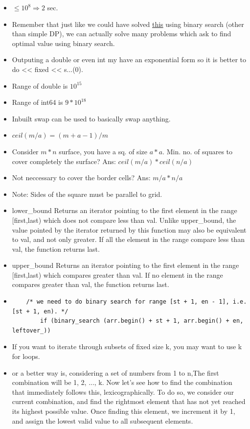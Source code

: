 \documentclass[8pt, a4paper, oneside, twocolumn]{extarticle}
\begin{document}
\begin{itemize}
\begin{verbatim}
    }
}
\end{verbatim}
    \item $\leq 10^8 \Rightarrow 2$ sec.
    \item Remember that just like we could have solved \href{https://uva.onlinejudge.org/external/7/714.pdf}{this} using binary search (other than simple DP), we can actually solve many problems which ask to find optimal value using binary search.
    \item Outputing a double or even int my have an exponential form so it is better to do << fixed << s...(0).
    \item Range of double is $10^{15}$
    \item Range of int64 is $9 * 10^{18}$
    \item Inbuilt swap can be used to basically swap anything.
    \item $ceil(m/a) = (m + a - 1) / m$
    \item Consider $m*n$ surface, you have a sq. of size $a*a$. Min. no. of squares to cover completely the surface? Ans: $ceil(m/a)*ceil(n/a)$
    \item Not neccessary to cover the border cells? Ans: $m/a * n/a$
    \item Note: Sides of the square must be parallel to grid.
    \item  lower\_bound Returns an iterator pointing to the first element in the range [first,last) which does not compare less than val. Unlike upper\_bound, the value pointed by the iterator returned by this function may also be equivalent to val, and not only greater. If all the element in the range compare less than val, the function returns last.
    \item upper\_bound Returns an iterator pointing to the first element in the range [first,last) which compares greater than val. If no element in the range compares greater than val, the function returns last.
    \item 
    \begin{verbatim}
    /* we need to do binary search for range [st + 1, en - 1], i.e. [st + 1, en). */
        if (binary_search (arr.begin() + st + 1, arr.begin() + en, leftover_))
    \end{verbatim}
    \item If you want to iterate through subsets of fixed size k, you may want to use k for loops.
    \item or a better way is, considering a set of numbers from 1 to n,The first combination will be 1, 2, ..., k. Now let's see how to find the combination that immediately follows this, lexicographically. To do so, we consider our current combination, and find the rightmost element that has not yet reached its highest possible value. Once finding this element, we increment it by 1, and assign the lowest valid value to all subsequent elements.

\end{itemize}
\end{document}
